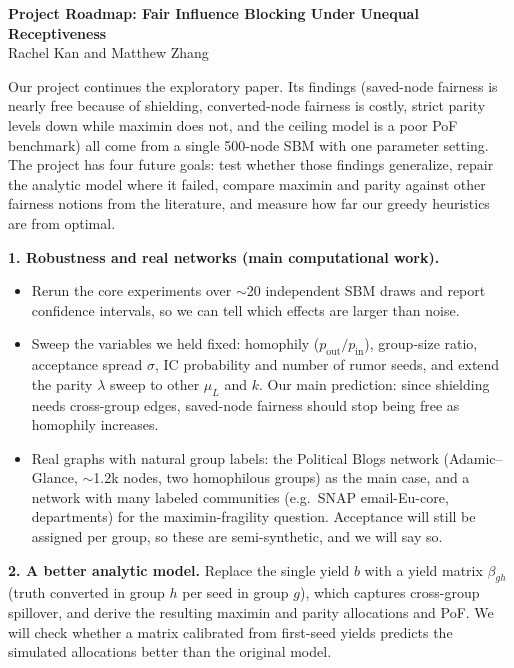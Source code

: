 \documentclass[11pt]{article}
\begin{document}
\begin{center}
{\large\bfseries Project Roadmap: Fair Influence Blocking Under Unequal Receptiveness}\\[2pt]
Rachel Kan and Matthew Zhang
\end{center}

Our project continues the exploratory paper. Its findings (saved-node fairness is
nearly free because of shielding, converted-node fairness is costly, strict parity
levels down while maximin does not, and the ceiling model is a poor PoF benchmark)
all come from a single 500-node SBM with one parameter setting. The project has
four future goals: test whether those findings generalize, repair the analytic model
where it failed, compare maximin and parity against other fairness notions from the
literature, and measure how far our greedy heuristics are from optimal.

\textbf{1. Robustness and real networks (main computational work).}
\begin{itemize}
  \item Rerun the core experiments over $\sim$20 independent SBM draws and report
        confidence intervals, so we can tell which effects are larger than noise.
  \item Sweep the variables we held fixed: homophily ($p_{\mathrm{out}}/p_{\mathrm{in}}$),
        group-size ratio, acceptance spread $\sigma$, IC probability and number of
        rumor seeds, and extend the parity $\lambda$ sweep to other $\mu_L$ and $k$.
        Our main prediction: since shielding needs cross-group edges, saved-node
        fairness should stop being free as homophily increases.
  \item Real graphs with natural group labels: the Political Blogs network
        (Adamic--Glance, $\sim$1.2k nodes, two homophilous groups) as the main case,
        and a network with many labeled communities (e.g.\ SNAP email-Eu-core,
        departments) for the maximin-fragility question. Acceptance will still be
        assigned per group, so these are semi-synthetic, and we will say so.
\end{itemize}

\textbf{2. A better analytic model.} Replace the single yield $b$ with a yield
matrix $\beta_{gh}$ (truth converted in group $h$ per seed in group $g$), which
captures cross-group spillover, and derive the resulting maximin and parity
allocations and PoF. We will check whether a matrix calibrated from first-seed
yields predicts the simulated allocations better than the original model.
\end{document}
